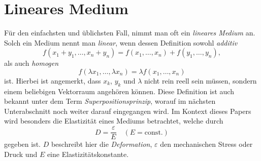 %
%
%
%
\section{Lineares Medium\label{particles:section:linear}}
Für den einfachsten und üblichsten Fall, nimmt man oft ein \emph{lineares Medium} an.
Solch ein Medium nennt man \emph{linear}, wenn dessen Definition sowohl \emph{additiv}
\[
    f(x_{1} + y_{1}, \ldots, x_{n} + y_{n}) 
    = 
    f(x_{1}, \ldots, x_{n}) 
    + 
    f(y_{1}, \ldots, y_{n}),
\]
als auch \emph{homogen}
\[
    f(\lambda x_{1}, \ldots, \lambda x_{n}) 
    = 
    \lambda f(x_{1}, \ldots, x_{n})
\]
ist.
Hierbei ist angemerkt, dass $x_{k}$, $y_{k}$ und $\lambda$ nicht rein reell sein müssen, 
sondern einem beliebigen Vektorraum angehören können. %
Diese Definition ist auch bekannt unter dem Term \emph{Superpositionsprinzip}, 
worauf im nächsten Unterabschnitt noch weiter darauf eingegangen wird. %
Im Kontext dieses Papers wird besonders die Elastizität eines Mediums betrachtet, 
welche durch
\[
    D %
    = 
    \frac{\varepsilon}{E}
    \quad
    (E = \text{const.})\label{particles:eq:lin-elastizitaet}
\]
gegeben ist. 
$D$ beschreibt hier die \emph{Deformation},
$\varepsilon$ den mechanischen Stress oder Druck und %
$E$ eine Elastizitätskonstante.


